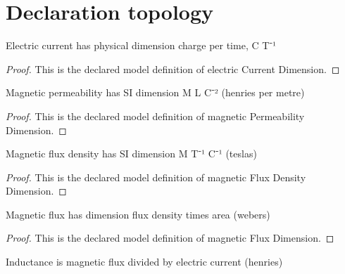 \section{Declaration topology}
\begin{definition}
  \label{def:physics:phyx-mini-0921:phyxminiproblems-problemphyxmini0921-electriccurrentdimension}
  Electric current has physical dimension charge per time, C T⁻¹
\end{definition}
\begin{proof}
  This is the declared model definition of electric Current Dimension.
\end{proof}
\begin{definition}
  \label{def:physics:phyx-mini-0921:phyxminiproblems-problemphyxmini0921-magneticpermeabilitydimension}
  Magnetic permeability has SI dimension M L C⁻² (henries per metre)
\end{definition}
\begin{proof}
  This is the declared model definition of magnetic Permeability Dimension.
\end{proof}
\begin{definition}
  \label{def:physics:phyx-mini-0921:phyxminiproblems-problemphyxmini0921-magneticfluxdensitydimension}
  Magnetic flux density has SI dimension M T⁻¹ C⁻¹ (teslas)
\end{definition}
\begin{proof}
  This is the declared model definition of magnetic Flux Density Dimension.
\end{proof}
\begin{definition}
  \label{def:physics:phyx-mini-0921:phyxminiproblems-problemphyxmini0921-magneticfluxdimension}
  Magnetic flux has dimension flux density times area (webers)
\end{definition}
\begin{proof}
  This is the declared model definition of magnetic Flux Dimension.
\end{proof}
\begin{definition}
  \label{def:physics:phyx-mini-0921:phyxminiproblems-problemphyxmini0921-inductancedimension}
  Inductance is magnetic flux divided by electric current (henries)
\end{definition}
